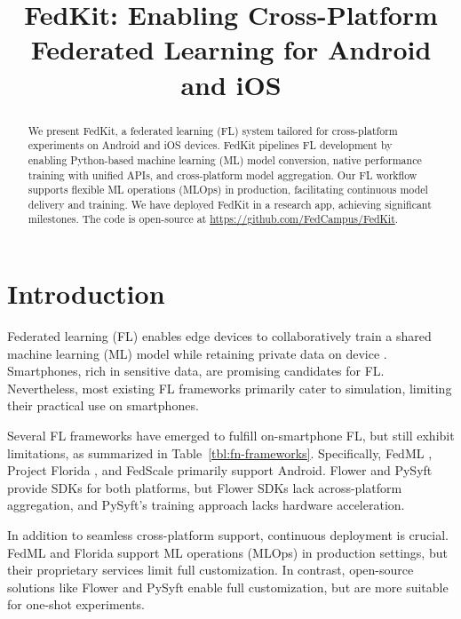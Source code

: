 \documentclass[letterpaper]{article} %
\title{FedKit: Enabling Cross-Platform Federated Learning for Android and iOS}
\author{}
\begin{document}
\maketitle

\begin{abstract}
    We present FedKit, a federated learning (FL) system tailored for
    cross-platform experiments on Android and iOS devices.
    FedKit pipelines FL development by
    enabling Python-based machine learning (ML) model conversion,
    native performance training with unified APIs,
    and cross-platform model aggregation.
    Our FL workflow supports flexible ML operations (MLOps) in production,
    facilitating continuous model delivery and training.
    We have deployed FedKit in a research app,
    achieving significant milestones.
    The code is open-source at \url{https://github.com/FedCampus/FedKit}.
\end{abstract}

\section{Introduction}

Federated learning (FL) enables edge devices to
collaboratively train a shared machine learning (ML) model while
retaining private data on device \cite{mcmahan2017communication}.
Smartphones, rich in sensitive data,
are promising candidates for FL.
Nevertheless, most existing FL frameworks
\cite[e.g.,][]{bonawitz2019towards,liu2021fate,ma2019paddlepaddle,openfl_citation}
primarily cater to simulation,
limiting their practical use on smartphones.

Several FL frameworks have emerged to fulfill on-smartphone FL,
but still exhibit limitations,
as summarized in Table~\ref{tbl:fn-frameworks}.
Specifically, FedML \cite{he2020fedml},
Project Florida \cite{madrigal2023project},
and FedScale \cite{lai2022fedscale} primarily support Android.
Flower \cite{beutel2020flower,mathur2021ondevice} and
PySyft \cite{ryffel2018generic,Ziller2021,hall2021syft}
provide SDKs for both platforms,
but Flower SDKs lack across-platform aggregation,
and PySyft's training approach lacks hardware acceleration.

In addition to seamless cross-platform support,
continuous deployment is crucial.
FedML and Florida support ML operations (MLOps) in production settings,
but their proprietary services limit full customization.
In contrast, open-source solutions like Flower and PySyft enable
full customization,
but are more suitable for one-shot experiments.
\end{document}

